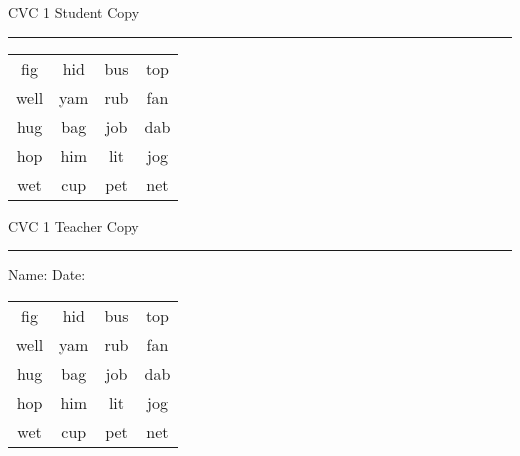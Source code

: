 \documentclass{memoir}
\begin{document}

\footnotesize \noindent
CVC 1 \hfill Student Copy
\smallskip
\hrule

\Large

\setlength{\tabcolsep}{14pt}
\def\arraystretch{2}

{\selectfont


\begin{vplace}[0.5]
\begin{center}
\begin{tabular}{cccc}
fig & hid & bus & top \\
well & yam & rub & fan \\
hug & bag & job & dab \\
hop & him & lit & jog \\
wet & cup & pet & net \\
\end{tabular}
\end{center}
\end{vplace}

}

\newpage

\footnotesize \noindent
CVC 1 \hfill Teacher Copy
\smallskip
\hrule

\small

\vfill

\noindent
Name: \underline{\hspace{1.75in}} \hfill Date: \underline{\hspace{1in}}

\Large

{\selectfont


\begin{vplace}[0.5]
\begin{center}
\begin{tabular}{cccc}
fig & hid & bus & top \\
well & yam & rub & fan \\
hug & bag & job & dab \\
hop & him & lit & jog \\
wet & cup & pet & net \\
\end{tabular}
\end{center}
\end{vplace}



}
\end{document}
